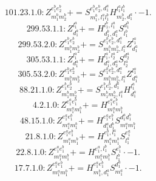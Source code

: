 \documentclass[letterpaper,10pt,fleqn,leqno,onecolumn]{article}
\begin{document}
\begin{equation} \;\;\;\;\;\;  101.23.1.0: Z^{e_{1}^{b}e_{2}^{b}}_{m_{1}^{b}m_{2}^{b}}+=S^{e_{1}^{b}e_{2}^{b},d_{1}^{a}}_{m_{1}^{b},l_{1}^{a}l_{1}^{b}}H^{l_{1}^{a}l_{1}^{b}}_{m_{2}^{b},d_{1}^{a}}\cdot -1. \end{equation}
\begin{equation} \;\;\;\;\;\;  299.53.1.1: Z^{l_{1}^{a}}_{d_{1}^{a}}+=H^{l_{1}^{b},l_{1}^{a}}_{d_{1}^{b},d_{1}^{a}}S^{d_{1}^{b}}_{l_{1}^{b}} \end{equation}
\begin{equation} \;\;\;\;\;\;  299.53.2.0: Z^{e_{1}^{b}e_{2}^{b}}_{m_{1}^{b}m_{2}^{b}}+=S^{e_{1}^{b}e_{2}^{b},d_{1}^{a}}_{m_{1}^{b}m_{2}^{b},l_{1}^{a}}Z^{l_{1}^{a}}_{d_{1}^{a}} \end{equation}
\begin{equation} \;\;\;\;\;\;  305.53.1.1: Z^{l_{1}^{a}}_{d_{1}^{a}}+=H^{l_{1}^{a},l_{2}^{a}}_{d_{1}^{a},d_{2}^{a}}S^{d_{2}^{a}}_{l_{2}^{a}} \end{equation}
\begin{equation} \;\;\;\;\;\;  305.53.2.0: Z^{e_{1}^{b}e_{2}^{b}}_{m_{1}^{b}m_{2}^{b}}+=S^{e_{1}^{b}e_{2}^{b},d_{1}^{a}}_{m_{1}^{b}m_{2}^{b},l_{1}^{a}}Z^{l_{1}^{a}}_{d_{1}^{a}} \end{equation}
\begin{equation} \;\;\;\;\;\;  88.21.1.0: Z^{e_{1}^{b}e_{2}^{b}}_{m_{1}^{b}m_{2}^{b}}+=S^{e_{1}^{b}e_{2}^{b},d_{1}^{a}}_{m_{1}^{b}m_{2}^{b},l_{1}^{a}}H^{l_{1}^{a}}_{d_{1}^{a}} \end{equation}
\begin{equation} \;\;\;\;\;\;  4.2.1.0: Z^{e_{1}^{a}e_{1}^{b}}_{m_{1}^{a}m_{1}^{b}}+=H^{e_{1}^{a}e_{1}^{b}}_{m_{1}^{a}m_{1}^{b}} \end{equation}
\begin{equation} \;\;\;\;\;\;  48.15.1.0: Z^{e_{1}^{a}e_{1}^{b}}_{m_{1}^{a}m_{1}^{b}}+=H^{e_{1}^{a}e_{1}^{b}}_{d_{1}^{a}d_{1}^{b}}S^{d_{1}^{a}d_{1}^{b}}_{m_{1}^{a}m_{1}^{b}} \end{equation}
\begin{equation} \;\;\;\;\;\;  21.8.1.0: Z^{e_{1}^{a}e_{1}^{b}}_{m_{1}^{a}m_{1}^{b}}+=H^{e_{1}^{b},l_{1}^{a}}_{m_{1}^{a}m_{1}^{b}}S^{e_{1}^{a}}_{l_{1}^{a}} \end{equation}
\begin{equation} \;\;\;\;\;\;  22.8.1.0: Z^{e_{1}^{a}e_{1}^{b}}_{m_{1}^{a}m_{1}^{b}}+=H^{e_{1}^{a},l_{1}^{b}}_{m_{1}^{a}m_{1}^{b}}S^{e_{1}^{b}}_{l_{1}^{b}}\cdot -1. \end{equation}
\begin{equation} \;\;\;\;\;\;  17.7.1.0: Z^{e_{1}^{a}e_{1}^{b}}_{m_{1}^{a}m_{1}^{b}}+=H^{e_{1}^{a}e_{1}^{b}}_{m_{1}^{b},d_{1}^{a}}S^{d_{1}^{a}}_{m_{1}^{a}}\cdot -1. \end{equation}
\end{document}
